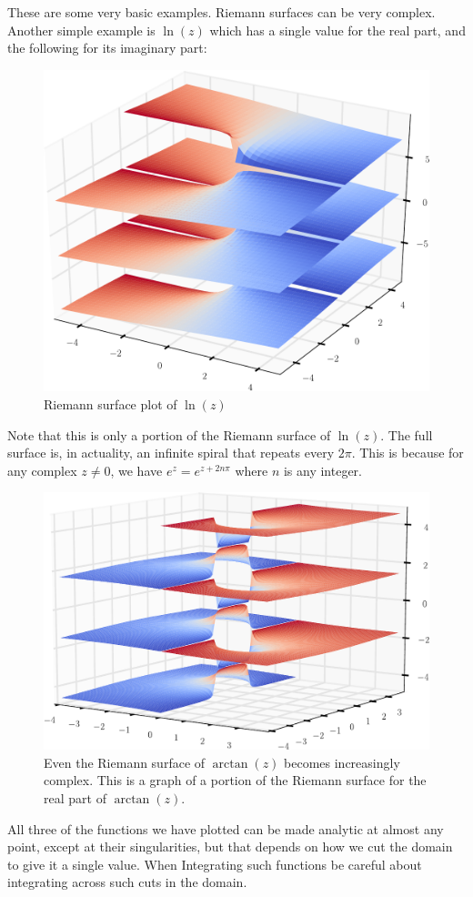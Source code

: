 These are some very basic examples.
Riemann surfaces can be very complex.
Another simple example is $\ln(z)$ which has a single value for the real part, and the following for its imaginary part:
\begin{figure}[h]
\includegraphics[width=\textwidth]{RiemannSurface3}
\caption{Riemann surface plot of $\ln(z)$}
\end{figure}
Note that this is only a portion of the Riemann surface of $\ln(z)$.
The full surface is, in actuality, an infinite spiral that repeats every $2\pi$.
This is because for any complex $z\neq 0$, we have $e^z=e^{z+2n\pi}$ where $n$ is any integer.
\begin{figure}[h]
\includegraphics[width=\textwidth]{RiemannSurface4.pdf}
\caption{Even the Riemann surface of $\arctan(z)$ becomes increasingly complex.
This is a graph of a portion of the Riemann surface for the real part of $\arctan(z)$.}
\end{figure}
All three of the functions we have plotted can be made analytic at almost any point, except at their singularities, but that depends on how we cut the domain to give it a single value.
When Integrating such functions be careful about integrating across such cuts in the domain.

